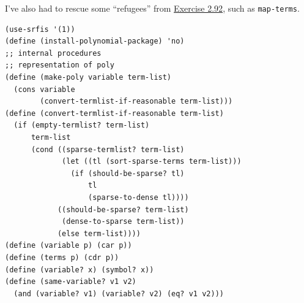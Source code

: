 \documentclass[final,fleqn,titlepage,twoside]{article}
\begin{document}
I've also had to rescue some ``refugees'' from \hyperref[sec:orgaed8b73]{Exercise 2.92}, such as \texttt{map-terms}. 

\begin{verbatim}
(use-srfis '(1))
(define (install-polynomial-package) 'no)
;; internal procedures
;; representation of poly
(define (make-poly variable term-list)
  (cons variable
        (convert-termlist-if-reasonable term-list)))
(define (convert-termlist-if-reasonable term-list)
  (if (empty-termlist? term-list)
      term-list
      (cond ((sparse-termlist? term-list)
             (let ((tl (sort-sparse-terms term-list)))
               (if (should-be-sparse? tl)
                   tl
                   (sparse-to-dense tl))))
            ((should-be-sparse? term-list)
             (dense-to-sparse term-list))
            (else term-list))))
(define (variable p) (car p))
(define (terms p) (cdr p))
(define (variable? x) (symbol? x))
(define (same-variable? v1 v2)
  (and (variable? v1) (variable? v2) (eq? v1 v2)))


\end{verbatim}
\end{document}
